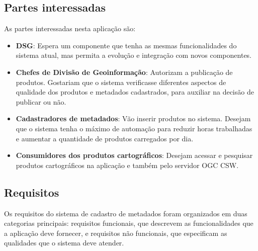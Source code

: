 \subsection{Partes interessadas}

As partes interessadas nesta aplicação são:
\begin{itemize} 
\item \textbf{DSG}: Espera um componente que tenha as mesmas funcionalidades do sistema atual, mas permita a evolução e integração com novos componentes.
\item \textbf{Chefes de Divisão de Geoinformação}: Autorizam a publicação de produtos. Gostariam que o sistema verificasse diferentes aspectos de qualidade dos produtos e metadados cadastrados, para auxiliar na decisão de publicar ou não.
\item \textbf{Cadastradores de metadados}: Vão inserir produtos no sistema. Desejam que o sistema tenha o máximo de automação para reduzir horas trabalhadas e aumentar a quantidade de produtos carregados por dia.
\item \textbf{Consumidores dos produtos cartográficos}: Desejam acessar e pesquisar produtos cartográficos na aplicação e também pelo servidor OGC CSW.
\end{itemize}

\subsection{Requisitos}
\label{sec:requisitos}

Os requisitos do sistema de cadastro de metadados foram organizados em duas categorias principais: requisitos funcionais, que descrevem as funcionalidades que a aplicação deve fornecer, e requisitos não funcionais, que especificam as qualidades que o sistema deve atender.

